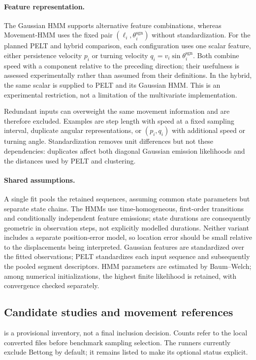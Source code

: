 \paragraph{Feature representation.}
The Gaussian HMM supports alternative feature combinations, whereas Movement-HMM uses the fixed pair $(\ell_i,\theta_i^{\mathrm{sgn}})$ without standardization.
For the planned PELT and hybrid comparison, each configuration uses one scalar feature, either persistence velocity $p_i$ or turning velocity $q_i=v_i\sin\theta_i^{\mathrm{sgn}}$.
Both combine speed with a component relative to the preceding direction; their usefulness is assessed experimentally rather than assumed from their definitions.
In the hybrid, the same scalar is supplied to PELT and its Gaussian HMM.
This is an experimental restriction, not a limitation of the multivariate implementation.

Redundant inputs can overweight the same movement information and are therefore excluded.
Examples are step length with speed at a fixed sampling interval, duplicate angular representations, or $(p_i,q_i)$ with additional speed or turning angle.
Standardization removes unit differences but not these dependencies: duplicates affect both diagonal Gaussian emission likelihoods and the distances used by PELT and clustering.

\paragraph{Shared assumptions.}
A single fit pools the retained sequences, assuming common state parameters but separate state chains.
The HMMs use time-homogeneous, first-order transitions and conditionally independent feature emissions; state durations are consequently geometric in observation steps, not explicitly modelled durations.
Neither variant includes a separate position-error model, so location error should be small relative to the displacements being interpreted.
Gaussian features are standardized over the fitted observations; PELT standardizes each input sequence and subsequently the pooled segment descriptors.
HMM parameters are estimated by Baum--Welch; among numerical initializations, the highest finite likelihood is retained, with convergence checked separately.

\subsection{Candidate studies and movement references}
\label{subsec:seg-benchmark-design}
 is a provisional inventory, not a final inclusion decision.
Counts refer to the local converted files before benchmark sampling selection.
The runners currently exclude Bettong by default; it remains listed to make its optional status explicit.

